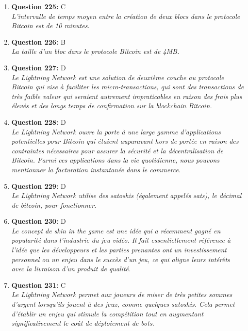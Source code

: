 \documentclass[12pt,a4paper]{article}
\begin{document}
\begin{enumerate}
\item \textbf{Question 225:} C
\\ \textit{L'intervalle de temps moyen entre la création de deux blocs dans le protocole Bitcoin est de 10 minutes.}

\item \textbf{Question 226:} B
\\ \textit{La taille d'un bloc dans le protocole Bitcoin est de 4MB.}

\item \textbf{Question 227:} D
\\ \textit{Le Lightning Network est une solution de deuxième couche au protocole Bitcoin qui vise à faciliter les micro-transactions, qui sont des transactions de très faible valeur qui seraient autrement impraticables en raison des frais plus élevés et des longs temps de confirmation sur la blockchain Bitcoin.}

\item \textbf{Question 228:} D
\\ \textit{Le Lightning Network ouvre la porte à une large gamme d'applications potentielles pour Bitcoin qui étaient auparavant hors de portée en raison des contraintes nécessaires pour assurer la sécurité et la décentralisation de Bitcoin. Parmi ces applications dans la vie quotidienne, nous pouvons mentionner la facturation instantanée dans le commerce.}

\item \textbf{Question 229:} D
\\ \textit{Le Lightning Network utilise des satoshis (également appelés sats), le décimal de bitcoin, pour fonctionner.}

\item \textbf{Question 230:} D
\\ \textit{Le concept de skin in the game est une idée qui a récemment gagné en popularité dans l'industrie du jeu vidéo. Il fait essentiellement référence à l'idée que les développeurs et les parties prenantes ont un investissement personnel ou un enjeu dans le succès d'un jeu, ce qui aligne leurs intérêts avec la livraison d'un produit de qualité.}

\item \textbf{Question 231:} C
\\ \textit{Le Lightning Network permet aux joueurs de miser de très petites sommes d'argent lorsqu'ils jouent à des jeux, comme quelques satoshis. Cela permet d'établir un enjeu qui stimule la compétition tout en augmentant significativement le coût de déploiement de bots.}


\end{enumerate}
\end{document}
